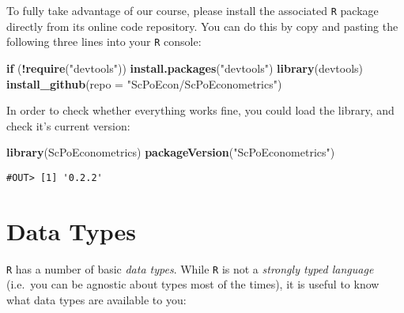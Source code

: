 \documentclass[]{book}
\newenvironment{Shaded}{\begin{snugshade}}{\end{snugshade}}
\newcommand{\KeywordTok}[1]{\textcolor[rgb]{0.13,0.29,0.53}{\textbf{#1}}}
\newcommand{\DataTypeTok}[1]{\textcolor[rgb]{0.13,0.29,0.53}{#1}}
\newcommand{\StringTok}[1]{\textcolor[rgb]{0.31,0.60,0.02}{#1}}
\newcommand{\ControlFlowTok}[1]{\textcolor[rgb]{0.13,0.29,0.53}{\textbf{#1}}}
\newcommand{\OperatorTok}[1]{\textcolor[rgb]{0.81,0.36,0.00}{\textbf{#1}}}
\newcommand{\NormalTok}[1]{#1}
\begin{document}
To fully take advantage of our course, please install the associated
\texttt{R} package directly from its online code repository. You can do
this by copy and pasting the following three lines into your \texttt{R}
console:

\begin{Shaded}
\begin{Highlighting}[]
\ControlFlowTok{if}\NormalTok{ (}\OperatorTok{!}\KeywordTok{require}\NormalTok{(}\StringTok{"devtools"}\NormalTok{)) }\KeywordTok{install.packages}\NormalTok{(}\StringTok{"devtools"}\NormalTok{)}
\KeywordTok{library}\NormalTok{(devtools)}
\KeywordTok{install_github}\NormalTok{(}\DataTypeTok{repo =} \StringTok{"ScPoEcon/ScPoEconometrics"}\NormalTok{)}
\end{Highlighting}
\end{Shaded}

In order to check whether everything works fine, you could load the
library, and check it's current version:

\begin{Shaded}
\begin{Highlighting}[]
\KeywordTok{library}\NormalTok{(ScPoEconometrics)}
\KeywordTok{packageVersion}\NormalTok{(}\StringTok{"ScPoEconometrics"}\NormalTok{)}
\end{Highlighting}
\end{Shaded}

\begin{verbatim}
#OUT> [1] '0.2.2'
\end{verbatim}

\section{Data Types}\label{data-types}

\texttt{R} has a number of basic \emph{data types}. While \texttt{R} is
not a \emph{strongly typed language} (i.e.~you can be agnostic about
types most of the times), it is useful to know what data types are
available to you:
\end{document}
